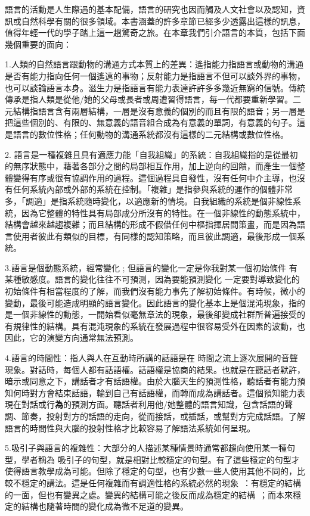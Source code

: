 語言的活動是人生際遇的基本配備，語言的研究也因而觸及人文社會以及認知，資訊或自然科學有關的很多領域。本書涵蓋的許多章節已經多少透露出這樣的訊息，值得年輕一代的學子踏上這一趟驚奇之旅。在本章我們引介語言的本質，包括下面幾個重要的面向：

1.人類的自然語言跟動物的溝通方式本質上的差異：遙指能力指語言或動物的溝通是否有能力指向任何一個遙遠的事物；反射能力是指語言不但可以談外界的事物，也可以談論語言本身。滋生力是指語言有能力表達許許多多幾近無窮的信號。傳統傳承是指人類是從他/她的父母或長者或周遭習得語言，每一代都要重新學習。二元結構指語言含有兩層結構，一層是沒有意義的個別的而且有限的語音；另一層是把這些個別的、有限的、無意義的語音組合成為有意義的單詞，有意義的句子。這是語言的數位性格；任何動物的溝通系統都沒有這樣的二元結構或數位性格。

2. 語言是一種複雜且具有適應力能「自我組織」的系統：自我組織指的是從最初的無序狀態中，藉著各部分之間的局部相互作用，加上逆向的回饋，而產生一個整體變得有序或很有協調作用的過程。這個過程具自發性，沒有任何中介主導，也沒有任何系統內部或外部的系統在控制。「複雜」是指參與系統的運作的個體非常多，「調適」是指系統隨時變化，以適應新的情境。自我組織的系統是個非線性系統，因為它整體的特性具有局部成分所沒有的特性。在一個非線性的動態系統中，結構會越來越趨複雜；而且結構的形成不假借任何中樞指揮居間策畫，而是因為語言使用者彼此有類似的目標，有同樣的認知策略，而且彼此調適，最後形成一個系統。

3.語言是個動態系統，經常變化 ; 但語言的變化一定是你我對某一個初始條件 有某種敏感度。語言的變化往往不可預測，因為要能預測變化 一定要對導致變化的初始條件有相當程度的了解，而我們沒有能力事先了解初始條件。有時候，微小的變動，最後可能造成明顯的語言變化。因此語言的變化基本上是個混沌現象，指的是一個非線性的動態，一開始看似毫無章法的現象，最後卻變成社群所普遍接受的有規律性的結構。具有混沌現象的系統在發展過程中很容易受外在因素的波動，也因此，它的演變方向通常無法預測。

4.語言的時間性：指人與人在互動時所講的話語是在 時間之流上逐次展開的音聲現象。對話時，每個人都有話語權。話語權是協商的結果。也就是在聽話者默許，暗示或同意之下，講話者才有話語權。由於大腦天生的預測性格，聽話者有能力預知何時對方會結束話語，輪到自己有話語權，而轉而成為講話者。這個預知能力表現在對話或行\textbf{為}的預測方面。聽話者利用他/她整體的語言知識，包含話語的聲調、節奏，投射對方的話語的走向，從而接話，或插話，或幫對方完成話語。了解語言的時間性與大腦的投射性格才比較容易了解語法系統如何呈現。

5.吸引子與語言的複雜性：大部分的人描述某種情景時通常都趨向使用某一種句型，學者稱為 吸引子的句型，就是相對比較穩定的句型。有了這些穩定的句型才使得語言教學成為可能。但除了穩定的句型，也有少數一些人使用其他不同的，比較不穩定的講法。這是任何複雜而有調適性格的系統必然的現象~：有穩定的結構的一面，但也有變異之處。變異的結構可能之後反而成為穩定的結構~；而本來穩定的結構也隨著時間的變化成為微不足道的變異。

